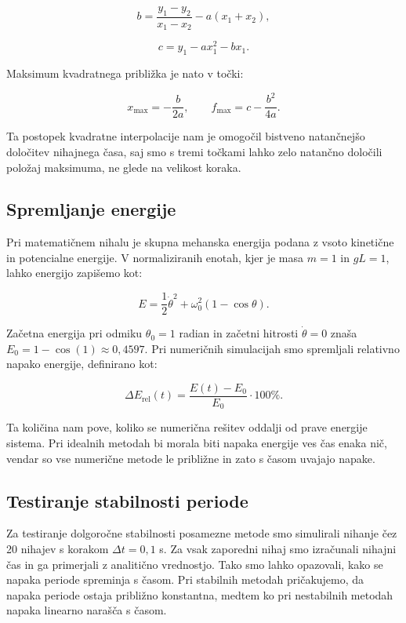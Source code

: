 \documentclass[12pt,a4paper]{article}
\begin{document}
\begin{equation}
b = \frac{y_1-y_2}{x_1-x_2} - a(x_1+x_2),
\end{equation}

\begin{equation}
c = y_1 - ax_1^2 - bx_1.
\end{equation}

Maksimum kvadratnega približka je nato v točki:

\begin{equation}
x_{\text{max}} = -\frac{b}{2a}, \qquad f_{\text{max}} = c - \frac{b^2}{4a}.
\end{equation}

Ta postopek kvadratne interpolacije nam je omogočil bistveno natančnejšo določitev nihajnega časa, saj smo s tremi točkami lahko zelo natančno določili položaj maksimuma, ne glede na velikost koraka.

\subsection{Spremljanje energije}

Pri matematičnem nihalu je skupna mehanska energija podana z vsoto kinetične in potencialne energije. V normaliziranih enotah, kjer je masa $m=1$ in $gL=1$, lahko energijo zapišemo kot:

\begin{equation}
E = \frac{1}{2} \dot{\theta}^2 + \omega_0^2 (1 - \cos\theta).
\end{equation}

Začetna energija pri odmiku $\theta_0 = 1$ radian in začetni hitrosti $\dot{\theta}=0$ znaša $E_0 = 1 - \cos(1) \approx 0,4597$. Pri numeričnih simulacijah smo spremljali relativno napako energije, definirano kot:

\begin{equation}
\Delta E_{\text{rel}}(t) = \frac{E(t) - E_0}{E_0} \cdot 100\%.
\end{equation}

Ta količina nam pove, koliko se numerična rešitev oddalji od prave energije sistema. Pri idealnih metodah bi morala biti napaka energije ves čas enaka nič, vendar so vse numerične metode le približne in zato s časom uvajajo napake.

\subsection{Testiranje stabilnosti periode}

Za testiranje dolgoročne stabilnosti posamezne metode smo simulirali nihanje čez 20 nihajev s korakom $\Delta t = 0,1$ s. Za vsak zaporedni nihaj smo izračunali nihajni čas in ga primerjali z analitično vrednostjo. Tako smo lahko opazovali, kako se napaka periode spreminja s časom. Pri stabilnih metodah pričakujemo, da napaka periode ostaja približno konstantna, medtem ko pri nestabilnih metodah napaka linearno narašča s časom.
\end{document}

